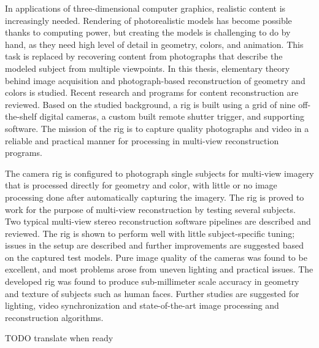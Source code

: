 \begin{abstractpage}[english]
In applications of three-dimensional computer graphics, realistic content is increasingly needed.
Rendering of photorealistic models has become possible thanks to computing power, but creating the models is challenging to do by hand, as they need high level of detail in geometry, colors, and animation.
This task is replaced by recovering content from photographs that describe the modeled subject from multiple viewpoints.
In this thesis, elementary theory behind image acquisition and photograph-based reconstruction of geometry and colors is studied.
Recent research and programs for content reconstruction are reviewed.
Based on the studied background, a rig is built using a grid of nine off-the-shelf digital cameras, a custom built remote shutter trigger, and supporting software.
The mission of the rig is to capture quality photographs and video in a reliable and practical manner for processing in multi-view reconstruction programs.

The camera rig is configured to photograph single subjects for multi-view imagery that is processed directly for geometry and color, with little or no image processing done after automatically capturing the imagery.
The rig is proved to work for the purpose of multi-view reconstruction by testing several subjects.
Two typical multi-view stereo reconstruction software pipelines are described and reviewed.
The rig is shown to perform well with little subject-specific tuning;
issues in the setup are described and further improvements are suggested based on the captured test models.
Pure image quality of the cameras was found to be excellent, and most problems arose from uneven lighting and practical issues.
The developed rig was found to produce sub-millimeter scale accuracy in geometry and texture of subjects such as human faces.
Further studies are suggested for lighting, video synchronization and state-of-the-art image processing and reconstruction algorithms.
\end{abstractpage}

\newpage

\keywords{}
\begin{abstractpage}[finnish]
	TODO translate when ready
\end{abstractpage}
